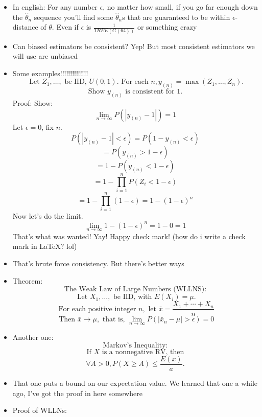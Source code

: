 \documentclass{article}
\begin{document}
\begin{itemize}
\[      \]
    \item In english: For any number $ \epsilon $, no matter how small, if you go far enough down the $ \hat{\theta}_n $ sequence you'll find some $ \hat{\theta}_n $s that are guaranteed to be within $ \epsilon $-distance of $ \theta $. Even if $ \epsilon $ is $ \frac{1}{TREE(G(64))} $ or something crazy
    \item Can biased estimators be consistent? Yep! But most consistent estimators we will use are unbiased
    \item Some examples!!!!!!!!!!!!!!
      \[
        \text{ Let } Z_1, \ldots, \text{ be IID, } U(0, 1). \text{ For each } n, y_{(n)} = \max(Z_1, \ldots, Z_n).
      \] 
      \[
        \text{ Show } y_{(n)} \text{ is consistent for 1. }
      \] 
      Proof: Show:
      \[
        \lim_{n \to \infty} P\left( \left|y_{(n)} - 1 \right| \right) = 1
      \] 
      Let $ \epsilon = 0 $, fix $ n $.
       \[
         P \left( \left| y_{(n)} - 1 \right| < \epsilon \right) = P \left( 1 - y_{(n)} < \epsilon \right)
      \] 
      \[
        = P(y_{(n)} > 1 - \epsilon)
      \] 
      \[
        = 1 - P (y_{(n)} < 1 - \epsilon)
      \] 
      \[
        = 1 - \prod_{i = 1}^{n} P(Z_i < 1 - \epsilon)
      \]
      \[
        = 1 - \prod_{i = 1}^{n} (1 - \epsilon) = 1 - {(1 - \epsilon)}^n
      \] 
      Now let's do the limit.
      \[
        \lim_{n \to \infty} 1 - {(1 - \epsilon)}^n = 1 - 0 = 1
      \] 
      That's what was wanted! Yay! Happy check mark! (how do i write a check mark in LaTeX\@? lol)
    \item That's brute force consistency. But there's better ways
    \item Theorem: 
      \[
        \text{ The Weak Law of Large Numbers (WLLNS): }
      \] 
      \[
        \text{ Let } X_1, \ldots, \text{ be IID, with } E(X_i) = \mu.
      \] \[
        \text{ For each positive integer } n,  \text{ let } \bar{x} = \frac{X_1 + \cdots + X_n}{n}
      \] \[
      \text{ Then } \bar{x} \rightarrow \mu, \text{ that is, } \lim_{n \to \infty} P( \left| \bar{x}_n - \mu \right| > \epsilon) = 0
      \] 
    \item Another one:
      \[
        \text{ Markov's Inequality: }
      \] 
      \[
        \text{ If } X \text{ is a nonnegative RV, then }
      \] \[
      \forall A > 0, P(X \geq A) \leq \frac{E(x)}{a}.
      \]
    \item That one puts a bound on our expectation value. We learned that one a while ago, I've got the proof in here somewhere
    \item Proof of WLLNs:

\end{itemize}
\end{document}
